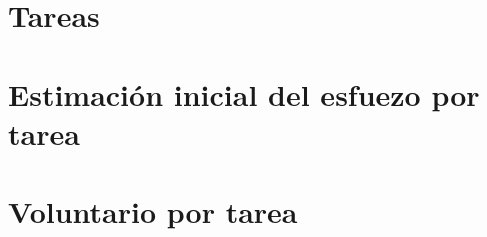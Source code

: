 \section{Tareas}



\section{Estimación inicial del esfuezo por tarea}

\section{Voluntario por tarea}
